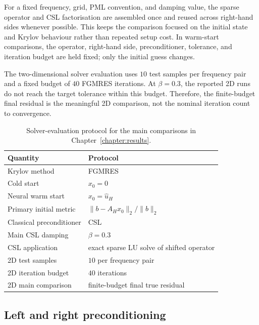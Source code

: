 For a fixed frequency, grid, PML convention, and damping value, the sparse
operator and CSL factorisation are assembled once and reused across
right-hand sides whenever possible. This keeps the comparison focused on the
initial state and Krylov behaviour rather than repeated setup cost. In
warm-start comparisons, the operator, right-hand side, preconditioner,
tolerance, and iteration budget are held fixed; only the initial guess
changes.

The two-dimensional solver evaluation uses $10$ test samples per frequency
pair and a fixed budget of $40$ FGMRES iterations. At $\beta=0.3$, the
reported 2D runs do not reach the target tolerance within this budget.
Therefore, the finite-budget final residual is the meaningful 2D comparison,
not the nominal iteration count to convergence.

\begin{table}[htbp]
\centering
\caption{Solver-evaluation protocol for the main comparisons in
Chapter~\ref{chapter:results}.}
\label{tab:setup-solver-protocol}
\begin{tabular}{ll}
\toprule
Quantity & Protocol \\
\midrule
Krylov method & FGMRES \\
Cold start & $x_0=0$ \\
Neural warm start & $x_0=\hat{u}_H$ \\
Primary initial metric & $\|b-A_Hx_0\|_2/\|b\|_2$ \\
Classical preconditioner & CSL \\
Main CSL damping & $\beta=0.3$ \\
CSL application & exact sparse LU solve of shifted operator \\
2D test samples & $10$ per frequency pair \\
2D iteration budget & $40$ iterations \\
2D main comparison & finite-budget final true residual \\
\bottomrule
\end{tabular}
\end{table}

\subsection{Left and right preconditioning}
\label{subsec:setup-left-right-preconditioning}

